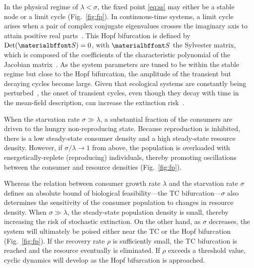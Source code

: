 \documentclass{pnastwo}
\begin{document}
\begin{article}
In the physical regime of $\lambda<\sigma$, the fixed point \eqref{eq:ss} may either be a stable node or a limit cycle (Fig.~\ref{fig:fp}).
In continuous-time systems, a limit cycle arises when a pair of complex conjugate eigenvalues crosses the imaginary axis to attain positive real parts~\cite{GuckHolmes}.
This Hopf bifurcation is defined by ${\rm Det}({\bf S}) = 0$, with $\bf S$ the Sylvester matrix, which is composed of the coefficients of the characteristic polynomial of the Jacobian matrix~\cite{Gross:2004p2428}.
As the system parameters are tuned to be within the stable regime but close to the Hopf bifurcation, the amplitude of the transient but decaying cycles become large.
Given that ecological systems are constantly being perturbed~\cite{Hastings:2001jh}, the onset of transient cycles, even though they decay with time in the mean-field description, can increase the extinction risk~\cite{Neubert:1997wk,Caswell:2005eo,Neubert:2009td}.

When the starvation rate $\sigma\gg\lambda$, a substantial fraction of the consumers are driven to the hungry non-reproducing state.
Because reproduction is inhibited, there is a low steady-state consumer density and a high steady-state resource density.
However, if $\sigma/\lambda\to 1$ from above, the population is overloaded with energetically-replete (reproducing) individuals, thereby promoting oscillations between the consumer and resource densities (Fig.~\ref{fig:fp}).

Whereas the relation between consumer growth rate $\lambda$ and the starvation rate $\sigma$ defines an absolute bound of biological feasibility---the TC bifurcation---$\sigma$ also determines the sensitivity of the consumer population to changes in resource density.
When $\sigma\gg\lambda$, the steady-state population density is small, thereby increasing the risk of stochastic extinction.
On the other hand, as $\sigma$ decreases, the system will ultimately be poised either near the TC or the Hopf bifurcation (Fig.~\ref{fig:fp}).
If the recovery rate $\rho$ is sufficiently small, the TC bifurcation is reached and the resource eventually is eliminated.
If $\rho$ exceeds a threshold value, cyclic dynamics will develop as the Hopf bifurcation is approached.
\\


\end{article}
\end{document}
